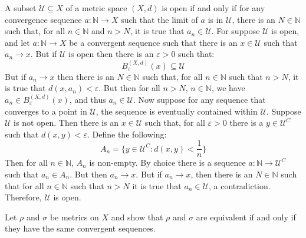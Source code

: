 \documentclass[crop=false,class=article,oneside]{standalone}
\begin{document}
    \begin{solution}
        A subset $\mathcal{U}\subseteq{X}$ of a metric space $(X,d)$ is
        open if and only if for any convergence sequence
        $a:\mathbb{N}\rightarrow{X}$ such that the limit of $a$ is in
        $\mathcal{U}$, there is an $N\in\mathbb{N}$ such that, for all
        $n\in\mathbb{N}$ and $n>N$, it is true that
        $a_{n}\in\mathcal{U}$. For suppose $\mathcal{U}$ is open, and
        let $a:\mathbb{N}\rightarrow{X}$ be a convergent sequence such
        that there is an $x\in\mathcal{U}$ such that
        $a_{n}\rightarrow{x}$. But if $\mathcal{U}$ is open then there
        is an $\varepsilon>0$ such that:
        \begin{equation}
            B_{\varepsilon}^{(X,d)}(x)\subseteq\mathcal{U}
        \end{equation}
        But if $a_{n}\rightarrow{x}$ then there is an
        $N\in\mathbb{N}$ such that, for all $n\in\mathbb{N}$ such that
        $n>N$, it is true that $d(x,a_{n})<\varepsilon$. But then for all
        $n>N$, $n\in\mathbb{N}$, we have
        $a_{n}\in{B}_{\varepsilon}^{(X,d)}(x)$, and thus
        $a_{n}\in\mathcal{U}$. Now suppose for any sequence that converges
        to a point in $\mathcal{U}$, the sequence is eventually contained
        within $\mathcal{U}$. Suppose $\mathcal{U}$ is not open. Then
        there is an $x\in\mathcal{U}$ such that, for all $\varepsilon>0$
        there is a $y\in\mathcal{U}^{C}$ such that
        $d(x,y)<\varepsilon$. Define the following:
        \begin{equation}
            A_{n}=\Big\{y\in\mathcal{U}^{C}:d(x,y)<\frac{1}{n}\Big\}
        \end{equation}
        Then for all $n\in\mathbb{N}$, $A_{n}$ is non-empty. By choice
        there is a sequence $a:\mathbb{N}\rightarrow\mathcal{U}^{C}$ such
        that $a_{n}\in{A}_{n}$. But then $a_{n}\rightarrow{x}$. But if
        $a_{n}\rightarrow{x}$, then there is an $N\in\mathbb{N}$ such that
        for all $n\in\mathbb{N}$ such that $n>N$ it is true that
        $a_{n}\in\mathcal{U}$, a contradiction. Therefore,
        $\mathcal{U}$ is open.
    \end{solution}
    \begin{problem}
        Let $\rho$ and $\sigma$ be metrics on $X$ and show that
        $\rho$ and $\sigma$ are equivalent if and only if they have
        the same convergent sequences.
    \end{problem}
\end{document}
